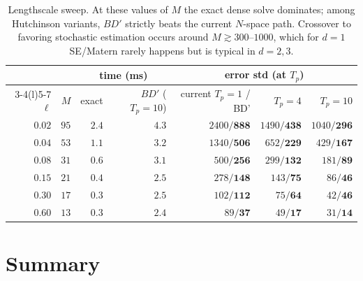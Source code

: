 \documentclass[11pt]{article}
\begin{document}
\begin{table}[h]
\centering
\begin{tabular}{rrrrrrr}
\toprule
& & \multicolumn{2}{c}{time (ms)} & \multicolumn{3}{c}{error std (at $T_p$)} \\
\cmidrule(l){3-4}\cmidrule(l){5-7}
$\ell$ & $M$ & exact & $BD'$ ($T_p{=}10$) & current $T_p{=}1$ / BD' & $T_p{=}4$ & $T_p{=}10$ \\
\midrule
$0.02$ & $95$ & $2.4$ & $4.3$  & $2400/\mathbf{888}$ & $1490/\mathbf{438}$ & $1040/\mathbf{296}$ \\
$0.04$ & $53$ & $1.1$ & $3.2$  & $1340/\mathbf{506}$ & $652/\mathbf{229}$  & $429/\mathbf{167}$  \\
$0.08$ & $31$ & $0.6$ & $3.1$  & $500/\mathbf{256}$  & $299/\mathbf{132}$  & $181/\mathbf{89}$   \\
$0.15$ & $21$ & $0.4$ & $2.5$  & $278/\mathbf{148}$  & $143/\mathbf{75}$   & $86/\mathbf{46}$    \\
$0.30$ & $17$ & $0.3$ & $2.5$  & $102/\mathbf{112}$  & $75/\mathbf{64}$    & $42/\mathbf{46}$    \\
$0.60$ & $13$ & $0.3$ & $2.4$  & $89/\mathbf{37}$    & $49/\mathbf{17}$    & $31/\mathbf{14}$    \\
\bottomrule
\end{tabular}
\caption{Lengthscale sweep. At these values of $M$ the exact dense solve dominates; among Hutchinson variants, $BD'$ strictly beats the current $N$-space path. Crossover to favoring stochastic estimation occurs around $M\gtrsim 300$--$1000$, which for $d=1$ SE/Matern rarely happens but is typical in $d=2,3$.}
\label{tab:sweep}
\end{table}

\section{Summary}
\end{document}
